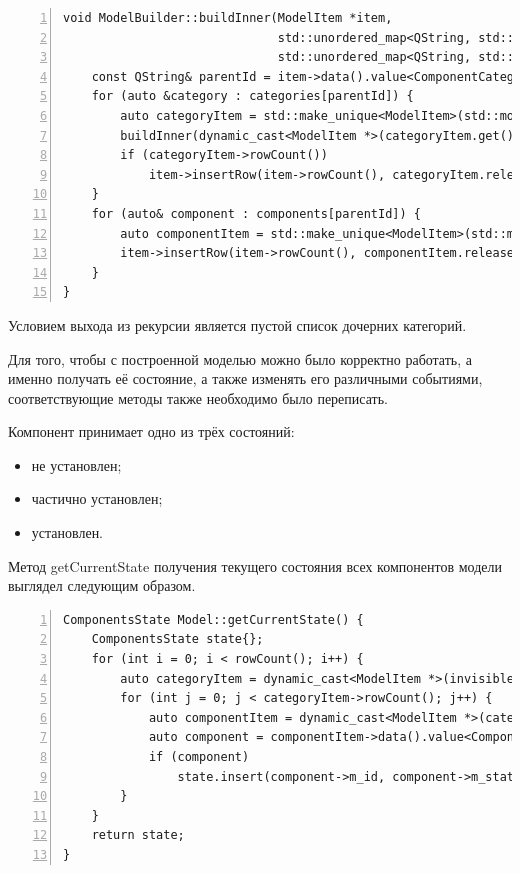 \documentclass[bachelor, och, pract]{SCWorks}
\begin{document}
\begin{Verbatim}[fontsize=\small,breaklines=true,numbers=left]
void ModelBuilder::buildInner(ModelItem *item,
                              std::unordered_map<QString, std::vector<std::unique_ptr<ComponentCategory>>> &categories,
                              std::unordered_map<QString, std::vector<std::unique_ptr<ComponentObject>>> &components) {
    const QString& parentId = item->data().value<ComponentCategory *>()->m_id;    
    for (auto &category : categories[parentId]) {
        auto categoryItem = std::make_unique<ModelItem>(std::move(category));
        buildInner(dynamic_cast<ModelItem *>(categoryItem.get()), categories, components);
        if (categoryItem->rowCount()) 
            item->insertRow(item->rowCount(), categoryItem.release());
    }
    for (auto& component : components[parentId]) {
        auto componentItem = std::make_unique<ModelItem>(std::move(component));
        item->insertRow(item->rowCount(), componentItem.release());
    }
}
\end{Verbatim}

Условием выхода из рекурсии является пустой список дочерних категорий.

Для того, чтобы с построенной моделью можно было корректно работать, а именно получать её состояние, а также изменять его различными событиями, соответствующие методы также необходимо было переписать.

Компонент принимает одно из трёх состояний:

\begin{itemize}
    \item не установлен;
    \item частично установлен;
    \item установлен.
\end{itemize}

Метод getCurrentState получения текущего состояния всех компонентов модели выглядел следующим образом.

\begin{Verbatim}[fontsize=\small,breaklines=true,numbers=left]
ComponentsState Model::getCurrentState() {
    ComponentsState state{};
    for (int i = 0; i < rowCount(); i++) {
        auto categoryItem = dynamic_cast<ModelItem *>(invisibleRootItem()->child(i));
        for (int j = 0; j < categoryItem->rowCount(); j++) {
            auto componentItem = dynamic_cast<ModelItem *>(categoryItem->child(j));
            auto component = componentItem->data().value<ComponentObject *>();
            if (component)
                state.insert(component->m_id, component->m_state);
        }
    }
    return state;
}
\end{Verbatim}
\end{document}
